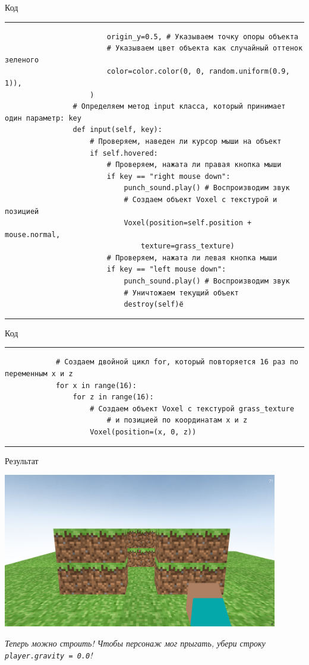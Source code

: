 \documentclass[handout]{beamer}
\begin{document}
    \begin{frame}[fragile]{Код}
        \scriptsize
        \rule{\textwidth}{1pt}
        \begin{verbatim}
            			origin_y=0.5, # Указываем точку опоры объекта
            			# Указываем цвет объекта как случайный оттенок зеленого
            			color=color.color(0, 0, random.uniform(0.9, 1)),
            		)
            	# Определяем метод input класса, который принимает один параметр: key
            	def input(self, key):
            		# Проверяем, наведен ли курсор мыши на объект
            		if self.hovered:
            			# Проверяем, нажата ли правая кнопка мыши
            			if key == "right mouse down":
            				punch_sound.play() # Воспроизводим звук
            				# Создаем объект Voxel с текстурой и позицией
            				Voxel(position=self.position + mouse.normal, 
                                texture=grass_texture)
            			# Проверяем, нажата ли левая кнопка мыши
            			if key == "left mouse down":
            				punch_sound.play() # Воспроизводим звук
            				# Уничтожаем текущий объект
            				destroy(self)ё
        \end{verbatim}
        \rule{\textwidth}{1pt}
    \end{frame}

    \begin{frame}[fragile]{Код}
        \scriptsize
        \rule{\textwidth}{1pt}
        \begin{verbatim}
            # Создаем двойной цикл for, который повторяется 16 раз по переменным x и z
            for x in range(16):
            	for z in range(16):
            		# Создаем объект Voxel с текстурой grass_texture
                        # и позицией по координатам x и z
            		Voxel(position=(x, 0, z))
        \end{verbatim}
        \rule{\textwidth}{1pt}
    \end{frame}
    
    \begin{frame}{Результат}
        \begin{center}
            \includegraphics[width=0.9\textwidth]{img/7.png} \\
            \begin{justify}
                \textit{Теперь можно строить! Чтобы персонаж мог прыгать, убери строку \texttt{player.gravity = 0.0}!}
            \end{justify}
        \end{center}
    \end{frame}
\end{document}
